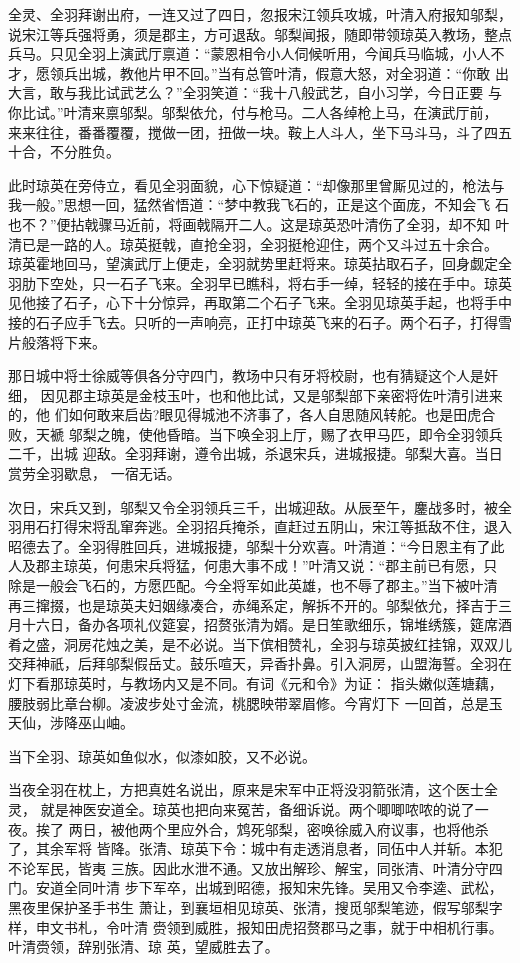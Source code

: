 全灵、全羽拜谢出府，一连又过了四日，忽报宋江领兵攻城，叶清入府报知邬梨，
说宋江等兵强将勇，须是郡主，方可退敌。邬梨闻报，随即带领琼英入教场，整点
兵马。只见全羽上演武厅禀道：“蒙恩相令小人伺候听用，今闻兵马临城，小人不
才，愿领兵出城，教他片甲不回。”当有总管叶清，假意大怒，对全羽道：“你敢
出大言，敢与我比试武艺么？”全羽笑道：“我十八般武艺，自小习学，今日正要
与你比试。”叶清来禀邬梨。邬梨依允，付与枪马。二人各绰枪上马，在演武厅前，
来来往往，番番覆覆，搅做一团，扭做一块。鞍上人斗人，坐下马斗马，斗了四五
十合，不分胜负。

此时琼英在旁侍立，看见全羽面貌，心下惊疑道：“却像那里曾厮见过的，枪法与
我一般。”思想一回，猛然省悟道：“梦中教我飞石的，正是这个面庞，不知会飞
石也不？”便拈戟骤马近前，将画戟隔开二人。这是琼英恐叶清伤了全羽，却不知
叶清已是一路的人。琼英挺戟，直抢全羽，全羽挺枪迎住，两个又斗过五十余合。
琼英霍地回马，望演武厅上便走，全羽就势里赶将来。琼英拈取石子，回身觑定全
羽肋下空处，只一石子飞来。全羽早已瞧科，将右手一绰，轻轻的接在手中。琼英
见他接了石子，心下十分惊异，再取第二个石子飞来。全羽见琼英手起，也将手中
接的石子应手飞去。只听的一声响亮，正打中琼英飞来的石子。两个石子，打得雪
片般落将下来。

那日城中将士徐威等俱各分守四门，教场中只有牙将校尉，也有猜疑这个人是奸细，
因见郡主琼英是金枝玉叶，也和他比试，又是邬梨部下亲密将佐叶清引进来的，他
们如何敢来启齿?眼见得城池不济事了，各人自思随风转舵。也是田虎合败，天褫
邬梨之魄，使他昏暗。当下唤全羽上厅，赐了衣甲马匹，即令全羽领兵二千，出城
迎敌。全羽拜谢，遵令出城，杀退宋兵，进城报捷。邬梨大喜。当日赏劳全羽歇息，
一宿无话。

次日，宋兵又到，邬梨又令全羽领兵三千，出城迎敌。从辰至午，鏖战多时，被全
羽用石打得宋将乱窜奔逃。全羽招兵掩杀，直赶过五阴山，宋江等抵敌不住，退入
昭德去了。全羽得胜回兵，进城报捷，邬梨十分欢喜。叶清道：“今日恩主有了此
人及郡主琼英，何患宋兵将猛，何患大事不成！”叶清又说：“郡主前已有愿，只
除是一般会飞石的，方愿匹配。今全将军如此英雄，也不辱了郡主。”当下被叶清
再三撺掇，也是琼英夫妇姻缘凑合，赤绳系定，解拆不开的。邬梨依允，择吉于三
月十六日，备办各项礼仪筵宴，招赘张清为婿。是日笙歌细乐，锦堆绣簇，筵席酒
肴之盛，洞房花烛之美，是不必说。当下傧相赞礼，全羽与琼英披红挂锦，双双儿
交拜神祇，后拜邬梨假岳丈。鼓乐喧天，异香扑鼻。引入洞房，山盟海誓。全羽在
灯下看那琼英时，与教场内又是不同。有词《元和令》为证：
指头嫩似莲塘藕，腰肢弱比章台柳。凌波步处寸金流，桃腮映带翠眉修。今宵灯下
一回首，总是玉天仙，涉降巫山岫。

当下全羽、琼英如鱼似水，似漆如胶，又不必说。

当夜全羽在枕上，方把真姓名说出，原来是宋军中正将没羽箭张清，这个医士全灵，
就是神医安道全。琼英也把向来冤苦，备细诉说。两个唧唧哝哝的说了一夜。挨了
两日，被他两个里应外合，鸩死邬梨，密唤徐威入府议事，也将他杀了，其余军将
皆降。张清、琼英下令：城中有走透消息者，同伍中人并斩。本犯不论军民，皆夷
三族。因此水泄不通。又放出解珍、解宝，同张清、叶清分守四门。安道全同叶清
步下军卒，出城到昭德，报知宋先锋。吴用又令李逵、武松，黑夜里保护圣手书生
萧让，到襄垣相见琼英、张清，搜觅邬梨笔迹，假写邬梨字样，申文书札，令叶清
赍领到威胜，报知田虎招赘郡马之事，就于中相机行事。叶清赍领，辞别张清、琼
英，望威胜去了。

